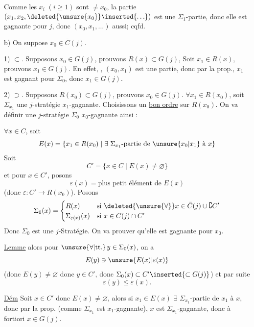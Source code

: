 Comme les $x_i$ $(i\geq1)$ sont $\ne x_0$, la partie $(x_1,x_2,\deleted{\unsure{x_0}}\inserted{\ldots})$ est une $\Sigma_1$-partie, donc elle est gagnante pour $j$, donc $(x_0,x_1,\ldots)$ aussi; cqfd.

b) On suppose $x_0\in\bar C(j)$.

1) $\subset$. Supposons $x_0\in G(j)$, prouvons $R(x)\subset G(j)$, Soit $x_1\in R(x)$, prouvons $x_1\in G(j)$. En effet, , $(x_0,x_1)$ est une partie, donc par la prop., $x_1$ est gagnant pour $\Sigma_0$, donc $x_1\in G(j)$.

2) $\supset$. Supposons $R(x_0)\subset G(j)$, prouvons $x_0\in G(j)$. $\forall x_1\in R(x_0)$, soit $\Sigma_{x_1}$ une $j$-stratégie $x_1$-gagnante. Choisissons un \uline{bon ordre} sur $R(x_0)$. On va définir une $j$-stratégie $\Sigma_0$ $x_0$-gagnante ainsi :

$\forall x\in C$, soit
\[
E(x)=\{x_1\in R(x_0)\mid\exists\ \Sigma_{x_1}\text{-partie de }\unsure{x_0|x_1}\text{ à }x\}
\]
Soit
\[
C'=\{x\in C\mid E(x)\ne\varnothing\}
\]
et pour $x\in C'$, posons
\[
\varepsilon(x)=\text{plus petit élément de }E(x)
\]
(donc $\varepsilon:C'\longrightarrow R(x_0)$). Posons
\[
\Sigma_0(x)=\begin{cases}
R(x)&\text{si }\deleted{\unsure{\forall}}x\in\bar C(j)\cup\complement C'\\
\Sigma_{\varepsilon(x)}(x)&\text{si }x\in C(j)\cap C'
\end{cases}
\]
Donc $\Sigma_0$ est une $j$-Stratégie. On va prouver qu'elle est gagnante pour $x_0$.

\uline{Lemme}\quad {}   alors  pour $\unsure{\forall|\text{tt.}}\,y\in\Sigma_0(x)$, on a
\[
E(y)\ni\unsure{E(x)|\varepsilon(x)}
\]
(donc $E(y)\ne\varnothing$ donc $y\in C'$, donc $\Sigma_0(x)\subset C'\inserted{\subset G(j)}$) et par suite
\[
\varepsilon(y)\leq\varepsilon(x).
\]

\uline{Dém}
Soit $x\in C'$ donc $E(x)\ne\varnothing$, alors si $x_1\in E(x)$ $\exists$  $\Sigma_{x_1}$-partie de $x_1$ à $x$, donc par la prop. (comme $\Sigma_{x_1}$ est $x_1$-gagnante), $x$ est $\Sigma_{x_1}$-gagnante, donc à fortiori $x\in G(j)$.

